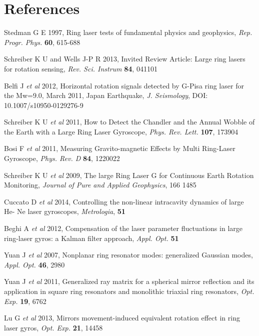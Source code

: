 \documentclass[12pt,a4paper,final]{iopart}
\begin{document}
\section*{References}
\begin{thebibliography}{10}

 Stedman G E 1997, Ring laser tests of fundamental physics and geophysics, 
\textit{Rep. Progr. Phys.} \textbf{60}, 615-688

 Schreiber K U and Wells J-P R 2013, Invited Review Article: 
Large ring lasers for rotation sensing, \textit{Rev. Sci. Instrum} \textbf{84}, 041101

 Belfi J \textit{et al} 2012, Horizontal rotation
signals detected by  G-Pisa  ring laser for the Mw=9.0, March
2011, Japan Earthquake, \textit{J. Seismology}, DOI: 10.1007/s10950-0129276-9

 Schreiber K U \textit{et al} 2011, How to Detect
the Chandler and the Annual Wobble of the Earth with a Large Ring
Laser Gyroscope, \textit{Phys. Rev. Lett.} \textbf{107}, 173904

 Bosi F \textit{et al} 2011, Measuring Gravito-magnetic
Effects by Multi Ring-Laser Gyroscope, \textit{Phys. Rev. D} \textbf{84}, 1220022

 Schreiber K U \textit{et al} 2009, The large Ring Laser
G for Continuous Earth Rotation Monitoring, \textit{Journal of Pure and
Applied Geophysics}, 166 1485

 Cuccato D \textit{et al} 2014, Controlling
the non-linear intracavity dynamics of large He- Ne laser gyroscopes,
\textit{Metrologia}, \textbf{51}

 Beghi A \textit{et al} 2012, Compensation
of the laser parameter fluctuations in large ring-laser gyros: a Kalman
filter approach, \textit{Appl. Opt.} \textbf{51}



 Yuan J \textit{et al} 2007, Nonplanar ring resonator
modes: generalized Gaussian modes, \textit{Appl. Opt.} \textbf{46}, 2980

 Yuan J \textit{et al} 2011, Generalized ray matrix for
a spherical mirror reflection and its application in square ring resonators
and monolithic triaxial ring resonators, \textit{Opt. Exp.} \textbf{19}, 6762

 Lu G \textit{et al} 2013, Mirrors movement-induced
equivalent rotation effect in ring laser gyros, \textit{Opt. Exp.} \textbf{21}, 14458


\end{thebibliography}
\end{document}
